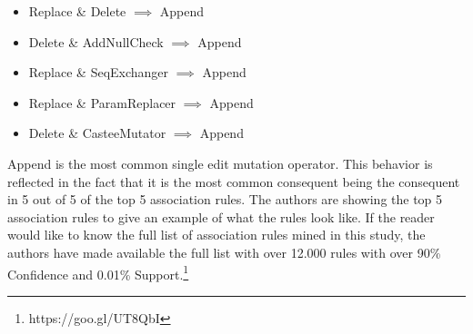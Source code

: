 \documentclass[conference]{IEEEtran}
\begin{document}
\begin{itemize}
\item Replace \& Delete $\implies$ Append
\item Delete \& AddNullCheck $\implies$ Append
\item Replace \& SeqExchanger $\implies$ Append
\item Replace \& ParamReplacer $\implies$ Append
\item Delete \& CasteeMutator $\implies$ Append
\end{itemize}

Append is the most common single edit mutation operator. This behavior is
reflected in the fact that it is the most common consequent being the consequent
in 5 out of 5 of the top 5 association rules. The authors are showing the top 5
association rules to give an example of what the rules look like. If the reader
would like to know the full list of association rules mined in this study, the
authors have made available the full list with over 12.000 rules with over 90\%
Confidence and 0.01\% Support.\footnote{https://goo.gl/UT8QbI} 
\end{document}
